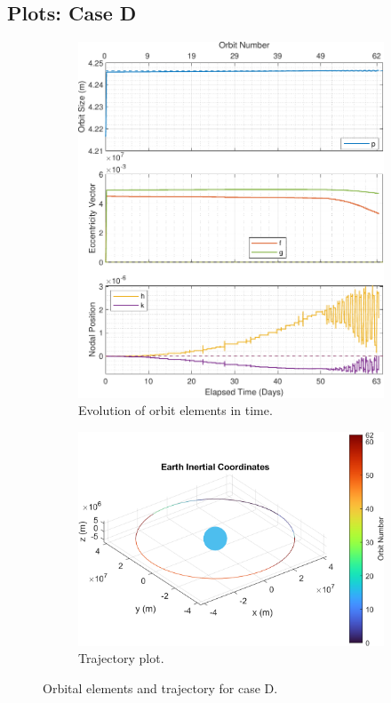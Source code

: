 \subsection{Plots: Case D}
\begin{figure}[H]
  \centering
  \begin{subfigure}[t]{0.4\textwidth}
    \includegraphics[width=\textwidth]{figures/geo_disposal/orbital_elements.pdf}
    \caption{Evolution of orbit elements in time.}
    \label{fig:results_results_c_a}
  \end{subfigure}
  \begin{subfigure}[t]{0.59\textwidth}
    \includegraphics[width=\textwidth]{figures/geo_disposal/trajectory_plot.png}
    \caption{Trajectory plot.}
    \label{fig:results_results_c_b}
  \end{subfigure}
  \caption{Orbital elements and trajectory for case D.}
  \label{fig:results_results_c}
\end{figure}

